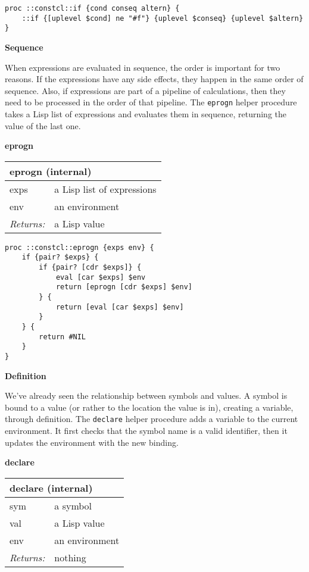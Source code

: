 \documentclass{report}
\begin{document}
\noindent\makebox[\linewidth]{\rule{\linewidth}{0.4pt}}
\begin{lstlisting}
proc ::constcl::if {cond conseq altern} {
    ::if {[uplevel $cond] ne "#f"} {uplevel $conseq} {uplevel $altern}
}
\end{lstlisting}
\noindent\makebox[\linewidth]{\rule{\linewidth}{0.4pt}}

\textbf{Sequence}


When expressions are evaluated in sequence, the order is important for two reasons. If the expressions have any side effects, they happen in the same order of sequence. Also, if expressions are part of a pipeline of calculations, then they need to be processed in the order of that pipeline. The \texttt{eprogn} helper procedure takes a Lisp list of expressions and evaluates them in sequence, returning the value of the last one.


\textbf{eprogn}

\begin{tabular}{ |l l| }
\hline
\multicolumn{2}{|l|}{eprogn (internal)} \\
\hline
exps & a Lisp list of expressions \\
env & an environment \\
\textit{Returns:} & a Lisp value \\
\hline
\end{tabular}

\noindent\makebox[\linewidth]{\rule{\linewidth}{0.4pt}}
\begin{lstlisting}
proc ::constcl::eprogn {exps env} {
    if {pair? $exps} {
        if {pair? [cdr $exps]} {
            eval [car $exps] $env
            return [eprogn [cdr $exps] $env]
        } {
            return [eval [car $exps] $env]
        }
    } {
        return #NIL
    }
}
\end{lstlisting}
\noindent\makebox[\linewidth]{\rule{\linewidth}{0.4pt}}

\textbf{Definition}


We've already seen the relationship between symbols and values. A symbol is bound to a value (or rather to the location the value is in), creating a variable, through definition. The \texttt{declare} helper procedure adds a variable to the current environment. It first checks that the symbol name is a valid identifier, then it updates the environment with the new binding.


\textbf{declare}

\begin{tabular}{ |l l| }
\hline
\multicolumn{2}{|l|}{declare (internal)} \\
\hline
sym & a symbol \\
val & a Lisp value \\
env & an environment \\
\textit{Returns:} & nothing \\
\hline
\end{tabular}
\end{document}
